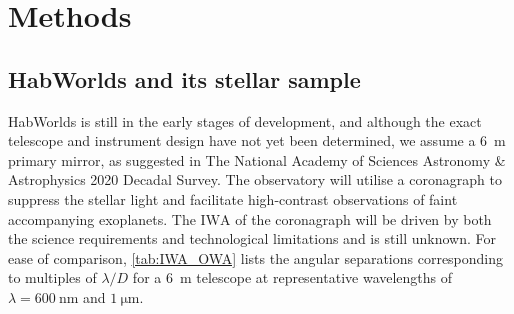 \documentclass[
    usenatbib,
]{mnras}
\newcommand{\IWA}{\ensuremath{\mathrm{IWA}}}
\newcommand{\hwo}{HabWorlds}
\begin{document}

\section{Methods}


\subsection{\hwo{} and its stellar sample}
\label{subsec:2.1}

\hwo{} is still in the early stages of development, and although the exact telescope and instrument design have not yet been determined, we assume a \qty{6}{\meter} primary mirror, as suggested in The National Academy of Sciences Astronomy \& Astrophysics 2020 Decadal Survey.
%
The observatory will utilise a coronagraph to suppress the stellar light and facilitate high-contrast observations of faint accompanying exoplanets. 
%
The \IWA{} of the coronagraph will be driven by both the science requirements and technological limitations and is still unknown.
For ease of comparison, \cref{tab:IWA_OWA} lists the angular separations corresponding to multiples of $\lambda / D$ for a \qty{6}{\meter} telescope at representative wavelengths of $\lambda = \qty{600}{\nano\meter}$ and $\qty{1}{\micro\meter}$.
\end{document}
